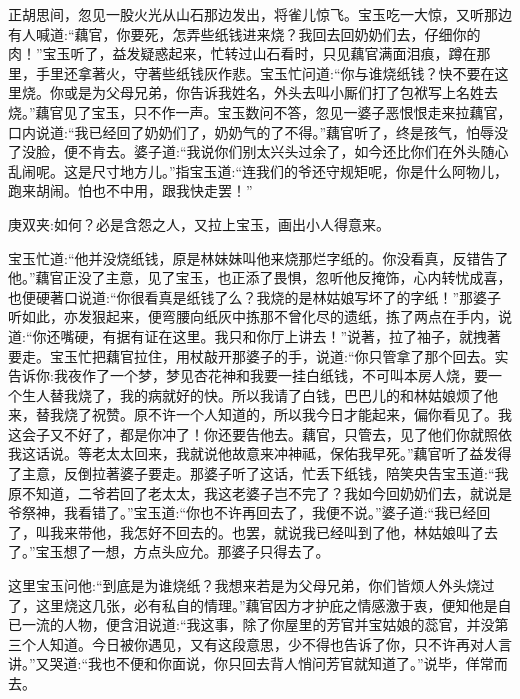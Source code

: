 \begin{parag}
    正胡思间，忽见一股火光从山石那边发出，将雀儿惊飞。宝玉吃一大惊，又听那边有人喊道:“藕官，你要死，怎弄些纸钱进来烧？我回去回奶奶们去，仔细你的肉！”宝玉听了，益发疑惑起来，忙转过山石看时，只见藕官满面泪痕，蹲在那里，手里还拿著火，守著些纸钱灰作悲。宝玉忙问道:“你与谁烧纸钱？快不要在这里烧。你或是为父母兄弟，你告诉我姓名，外头去叫小厮们打了包袱写上名姓去烧。”藕官见了宝玉，只不作一声。宝玉数问不答，忽见一婆子恶恨恨走来拉藕官，口内说道:“我已经回了奶奶们了，奶奶气的了不得。”藕官听了，终是孩气，怕辱没了没脸，便不肯去。婆子道:“我说你们别太兴头过余了，如今还比你们在外头随心乱闹呢。这是尺寸地方儿。”指宝玉道:“连我们的爷还守规矩呢，你是什么阿物儿，跑来胡闹。怕也不中用，跟我快走罢！”\begin{note}庚双夹:如何？必是含怨之人，又拉上宝玉，画出小人得意来。\end{note}宝玉忙道:“他并没烧纸钱，原是林妹妹叫他来烧那烂字纸的。你没看真，反错告了他。”藕官正没了主意，见了宝玉，也正添了畏惧，忽听他反掩饰，心内转忧成喜，也便硬著口说道:“你很看真是纸钱了么？我烧的是林姑娘写坏了的字纸！”那婆子听如此，亦发狠起来，便弯腰向纸灰中拣那不曾化尽的遗纸，拣了两点在手内，说道:“你还嘴硬，有据有证在这里。我只和你厅上讲去！”说著，拉了袖子，就拽著要走。宝玉忙把藕官拉住，用杖敲开那婆子的手，说道:“你只管拿了那个回去。实告诉你:我夜作了一个梦，梦见杏花神和我要一挂白纸钱，不可叫本房人烧，要一个生人替我烧了，我的病就好的快。所以我请了白钱，巴巴儿的和林姑娘烦了他来，替我烧了祝赞。原不许一个人知道的，所以我今日才能起来，偏你看见了。我这会子又不好了，都是你冲了！你还要告他去。藕官，只管去，见了他们你就照依我这话说。等老太太回来，我就说他故意来冲神祗，保佑我早死。”藕官听了益发得了主意，反倒拉著婆子要走。那婆子听了这话，忙丢下纸钱，陪笑央告宝玉道:“我原不知道，二爷若回了老太太，我这老婆子岂不完了？我如今回奶奶们去，就说是爷祭神，我看错了。”宝玉道:“你也不许再回去了，我便不说。”婆子道:“我已经回了，叫我来带他，我怎好不回去的。也罢，就说我已经叫到了他，林姑娘叫了去了。”宝玉想了一想，方点头应允。那婆子只得去了。
\end{parag}


\begin{parag}
    这里宝玉问他:“到底是为谁烧纸？我想来若是为父母兄弟，你们皆烦人外头烧过了，这里烧这几张，必有私自的情理。”藕官因方才护庇之情感激于衷，便知他是自已一流的人物，便含泪说道:“我这事，除了你屋里的芳官并宝姑娘的蕊官，并没第三个人知道。今日被你遇见，又有这段意思，少不得也告诉了你，只不许再对人言讲。”又哭道:“我也不便和你面说，你只回去背人悄问芳官就知道了。”说毕，佯常而去。
\end{parag}


